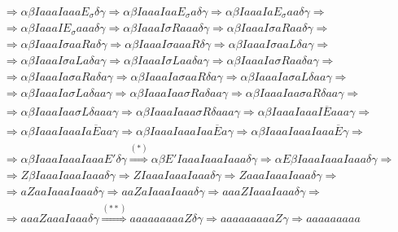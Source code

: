 \begin{ejercicio}
\begin{enumerate}
\begin{align*}
                  &\Rightarrow \alpha\beta IaaaIaaaE_{\sigma}\delta\gamma \Rightarrow \alpha\beta IaaaIaaE_{\sigma}a\delta\gamma\Rightarrow \alpha\beta IaaaIaE_{\sigma}aa\delta\gamma \Rightarrow \\
                  &\Rightarrow \alpha\beta IaaaIE_{\sigma}aaa\delta\gamma\Rightarrow \alpha\beta IaaaI\sigma R aaa\delta\gamma\Rightarrow\alpha\beta IaaaI\sigma aRaa\delta\gamma \Rightarrow \\
                  &\Rightarrow\alpha\beta IaaaI\sigma aaRa\delta\gamma\Rightarrow\alpha\beta IaaaI\sigma aaaR\delta\gamma\Rightarrow \alpha\beta IaaaI\sigma aaL\delta a\gamma\Rightarrow \\
                  &\Rightarrow \alpha\beta IaaaI\sigma aLa\delta a\gamma \Rightarrow \alpha\beta IaaaI\sigma Laa\delta a\gamma\Rightarrow \alpha\beta IaaaIa\sigma R aa\delta a \gamma \Rightarrow \\
                  &\Rightarrow \alpha\beta IaaaIa\sigma aRa \delta a\gamma\Rightarrow\alpha\beta IaaaIa\sigma aaR\delta a \gamma \Rightarrow \alpha \beta IaaaIa\sigma aL\delta aa \gamma \Rightarrow \\
                  &\Rightarrow\alpha\beta IaaaIa\sigma La\delta aa\gamma\Rightarrow\alpha\beta IaaaIaa\sigma Ra\delta aa\gamma\Rightarrow \alpha\beta IaaaIaa\sigma aR\delta aa\gamma\Rightarrow \\
                  &\Rightarrow\alpha\beta IaaaIaa\sigma L\delta aaa\gamma \Rightarrow \alpha\beta IaaaIaaa\sigma R\delta aaa\gamma\Rightarrow \alpha\beta IaaaIaaaI\overline{E}aaa\gamma \Rightarrow \\
                  &\Rightarrow \alpha\beta IaaaIaaaIa\overline{E}aa\gamma\Rightarrow\alpha\beta IaaaIaaaIaa\overline{E}a\gamma\Rightarrow\alpha\beta IaaaIaaaIaaa\overline{E}\gamma\Rightarrow \\
                  &\Rightarrow \alpha\beta IaaaIaaaIaaaE'\delta\gamma \stackrel{(\ast)}{\Rightarrow} \alpha\beta E' IaaaIaaaIaaa\delta\gamma \Rightarrow \alpha E\beta IaaaIaaaIaaa\delta\gamma \Rightarrow \\
                  &\Rightarrow Z\beta IaaaIaaaIaaa\delta\gamma\Rightarrow ZIaaaIaaaIaaa\delta\gamma \Rightarrow ZaaaIaaaIaaa\delta\gamma\Rightarrow \\
                  &\Rightarrow aZaaIaaaIaaa\delta\gamma\Rightarrow aaZaIaaaIaaa\delta\gamma\Rightarrow aaaZIaaaIaaa\delta\gamma\Rightarrow \\
                  &\Rightarrow aaaZaaaIaaa\delta\gamma \stackrel{(\ast\ast)}{\Rightarrow} aaaaaaaaaZ\delta\gamma \Rightarrow aaaaaaaaa Z\gamma\Rightarrow aaaaaaaaa

\end{align*}
\end{enumerate}
\end{ejercicio}
